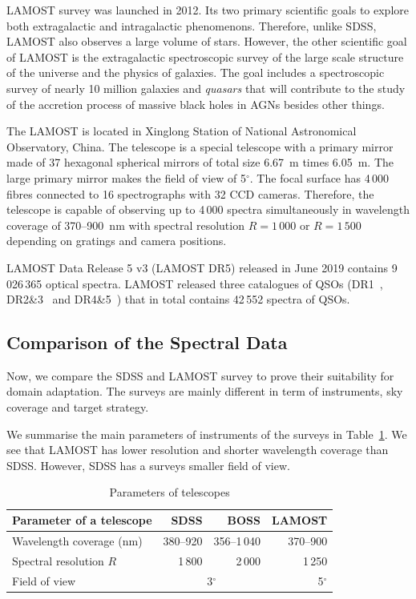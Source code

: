 LAMOST survey was launched in 2012.
Its two primary scientific goals to explore both extragalactic and intragalactic phenomenons.
Therefore, unlike SDSS, LAMOST also observes a large volume of stars.
However, the other scientific goal of LAMOST is the extragalactic spectroscopic survey of the large scale structure of the universe and the physics of galaxies.
The goal includes a spectroscopic survey of nearly 10 million galaxies and \textit{quasars}
that will contribute to the study of the accretion process of massive black holes in AGNs besides other things.~\cite{cui2012}

The LAMOST is located in Xinglong Station of National Astronomical Observatory, China.
The telescope is a special telescope with a primary mirror made of 37 hexagonal spherical mirrors of total size 6.67~m times 6.05~m.
The large primary mirror makes the field of view of 5\(^{\circ}\).
The focal surface has 4\,000 fibres connected to 16 spectrographs with 32 CCD cameras.
Therefore, the telescope is capable of observing up to 4\,000 spectra simultaneously
in wavelength coverage of 370--900~nm with spectral resolution \(R = 1\,000\) or \(R = 1\,500\) depending on gratings and camera positions.~\cite{cui2012}

LAMOST Data Release 5 v3 (LAMOST DR5) released in June 2019
contains 9\,026\,365 optical spectra.
LAMOST released three catalogues of QSOs
(DR1~\cite{ai2016}, DR2\&3~\cite{dong2018} and DR4\&5~\cite{yao2019})
that in total contains 42\,552 spectra of QSOs.

\subsection{Comparison of the Spectral Data}

Now, we compare the SDSS and LAMOST survey to prove their suitability for domain adaptation.
The surveys are mainly different in term of instruments, sky coverage and target strategy.

We summarise the main parameters of instruments of the surveys in Table~\ref{telescopes_parameters}.
We see that LAMOST has lower resolution and shorter wavelength coverage than SDSS.
However, SDSS has a surveys smaller field of view.

\begin{table}
\begin{center}
\begin{tabular}{|l|r|r|r|}
	\hline
	Parameter of a telescope & SDSS & BOSS & LAMOST \\
	\hline \hline
	Wavelength coverage (nm) & 380--920 & 356--1\,040 & 370--900 \\ \hline
	Spectral resolution \(R\) & 1\,800 & 2\,000 & 1\,250 \\ \hline
	Field of view & \multicolumn{2}{c|}{3\(^{\circ}\)} & 5\(^{\circ}\) \\ \hline
\end{tabular}
\end{center}
\caption{Parameters of telescopes}
\label{telescopes_parameters}
\end{table}

